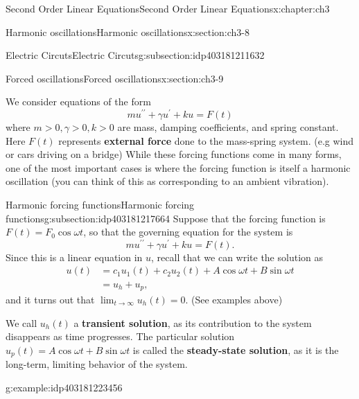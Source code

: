 \documentclass[oneside,10pt,]{book}
\newcommand{\terminology}[1]{\textbf{#1}}
\numberwithin{equation}{section}
\numberwithin{equation}{section}
\newcommand{\amp}{&}
\begin{document}
\begin{chapterptx}{Second Order Linear Equations}{}{Second Order Linear Equations}{}{}{x:chapter:ch3}
\begin{sectionptx}{Harmonic oscillations}{}{Harmonic oscillations}{}{}{x:section:ch3-8}
\begin{subsectionptx}{Electric Circuts}{}{Electric Circuts}{}{}{g:subsection:idp403181211632}
\begin{image}{0}{1}{0}
\end{image}%
\end{subsectionptx}
\end{sectionptx}
%
%
\typeout{************************************************}
\typeout{************************************************}
%
\begin{sectionptx}{Forced oscillations}{}{Forced oscillations}{}{}{x:section:ch3-9}
\begin{introduction}{}%
We consider equations of the form%
\begin{equation*}
mu^{\prime\prime}+\gamma u^{\prime}+ku=F(t)
\end{equation*}
where \(m>0,\gamma>0,k>0\) are mass, damping coefficients, and spring constant. Here \(F(t)\) represents \terminology{external force} done to the mass-spring system. (e.g wind or cars driving on a bridge) While these forcing functions come in many forms, one of the most important cases is where the forcing function is itself a harmonic oscillation (you can think of this as corresponding to an ambient vibration).%
\end{introduction}%
%
%
\typeout{************************************************}
\typeout{************************************************}
%
\begin{subsectionptx}{Harmonic forcing functions}{}{Harmonic forcing functions}{}{}{g:subsection:idp403181217664}
Suppose that the forcing function is \(F(t)=F_{0}\cos\omega t\), so that the governing equation for the system is%
\begin{equation*}
mu^{\prime\prime}+\gamma u^{\prime}+ku=F(t).
\end{equation*}
Since this is a linear equation in \(u\), recall that we can write the solution as%
\begin{align*}
u(t) \amp =c_{1}u_{1}(t)+c_{2}u_{2}(t)+A\cos\omega t+B\sin\omega t\\
\amp =u_{h}+u_{p},
\end{align*}
and it turns out that \(\lim_{t\to\infty}u_{h}(t)=0\). (See examples above)%
\par
We call \(u_{h}(t)\) a \terminology{transient solution}, as its contribution to the system disappears as time progresses. The particular solution \(u_{p}(t)=A\cos\omega t+B\sin\omega t\) is called the \terminology{steady-state solution}, as it is the long-term, limiting behavior of the system.%
\begin{example}{}{g:example:idp403181223456}%

\end{example}
\end{subsectionptx}
\end{sectionptx}
\end{chapterptx}
\end{document}
